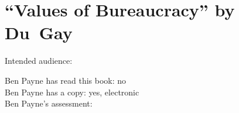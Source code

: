 \section{``Values of Bureaucracy'' by Du~Gay\label{review:dugay_values}}

\cite{2005_DuGay}

Intended audience:

Ben Payne has read this book: no\\
Ben Payne has a copy: yes, electronic\\
Ben Payne's assessment:


 